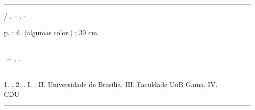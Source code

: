 \begin{fichacatalografica}
	\vspace*{\fill}					%
	\hrule							%
	\begin{center}					%
	\begin{minipage}[c]{12.5cm}		%
	
	\imprimirautor
	
	\hspace{0.5cm} \imprimirtitulo  / \imprimirautor. --
	\imprimirlocal, \imprimirdata-
	
	\hspace{0.5cm} \pageref{LastPage} p. : il. (algumas color.) ; 30 cm.\\
	
	\hspace{0.5cm} \imprimirorientadorRotulo~\imprimirorientador\\
	
	\hspace{0.5cm}
	\parbox[t]{\textwidth}{\imprimirtipotrabalho~--~\imprimirinstituicao,
	\imprimirdata.}\\
	
	\hspace{0.5cm}
		1. \imprimirpalavrachaveum.
		2. \imprimirpalavrachavedois.
		I. \imprimirorientador.
		II. Universidade de Brasília.
		III. Faculdade UnB Gama.
		IV. \imprimirtitulo\\ 			
	
	\hspace{8.75cm} CDU \\ %
	
	\end{minipage}
	\end{center}
	\hrule
        \pagebreak
\end{fichacatalografica}
